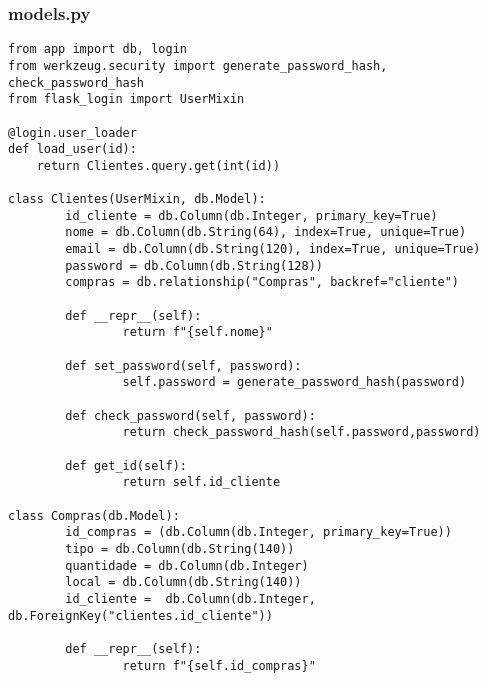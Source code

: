 \documentclass{report}
\begin{document}
\subsubsection{models.py}
\begin{lstlisting}
from app import db, login
from werkzeug.security import generate_password_hash, check_password_hash
from flask_login import UserMixin

@login.user_loader
def load_user(id):
    return Clientes.query.get(int(id))

class Clientes(UserMixin, db.Model):
        id_cliente = db.Column(db.Integer, primary_key=True)
        nome = db.Column(db.String(64), index=True, unique=True)
        email = db.Column(db.String(120), index=True, unique=True)
        password = db.Column(db.String(128))
        compras = db.relationship("Compras", backref="cliente")

        def __repr__(self):
                return f"{self.nome}"

        def set_password(self, password):
                self.password = generate_password_hash(password)

        def check_password(self, password):
                return check_password_hash(self.password,password)

        def get_id(self):
                return self.id_cliente

class Compras(db.Model):
        id_compras = (db.Column(db.Integer, primary_key=True))
        tipo = db.Column(db.String(140))
        quantidade = db.Column(db.Integer)
        local = db.Column(db.String(140))
        id_cliente =  db.Column(db.Integer, db.ForeignKey("clientes.id_cliente"))

        def __repr__(self):
                return f"{self.id_compras}"
\end{lstlisting}
\end{document}
